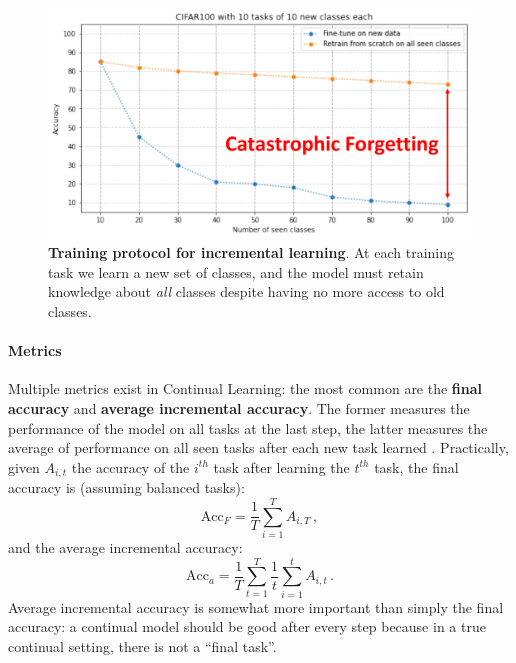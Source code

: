 \begin{figure}[tb]
      \begin{center}
            \includegraphics[width=0.8\linewidth]{images/related/catastrophic_forgetting.pdf}
      \end{center}
      \caption{\textbf{Training protocol for incremental learning}. At each training task we learn a
            new set of classes, and the model must retain knowledge about \textit{all} classes
            despite having no more access to old classes.}
      \label{fig:related_forgetting}
\end{figure}


\label{sec:related_metrics}

\paragraph{Metrics} Multiple metrics exist in Continual Learning: the most common are the \textbf{final accuracy} and
\textbf{average incremental accuracy}. The former measures the performance of the model on all tasks
at the last step, the latter measures the average of performance on all seen tasks after each new
task learned \citep{rebuffi2017icarl}. Practically, given $A_{i,t}$ the accuracy of the $i^{th}$
task after
learning the $t^{th}$ task, the final accuracy is (assuming balanced tasks):
%
\begin{equation}
      \text{Acc}_F = \frac{1}{T} \sum_{i=1}^T A_{i,T}\,,
      \label{eq:related_final_acc}
\end{equation}
%
and the average incremental accuracy:
%
\begin{equation}
      \text{Acc}_a = \frac{1}{T} \sum_{t=1}^T \frac{1}{t}  \sum_{i=1}^t A_{i,t}\,.
      \label{eq:related_avg_acc}
\end{equation}
%
Average incremental accuracy is somewhat more important than simply the final accuracy: a continual
model should be good after every step because in a true continual setting, there is not a ``final
task''.


